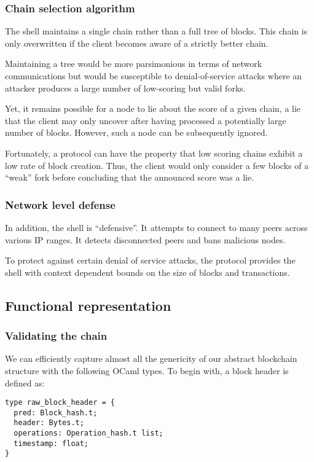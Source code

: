 \documentclass[letterpaper]{article}
\begin{document}
\subsubsection{Chain selection algorithm}
The shell maintains a single chain rather than a full tree of blocks. This chain
is only overwritten if the client becomes aware of a strictly better chain.

Maintaining a tree would be more parsimonious in terms of network communications
but would be susceptible to denial-of-service attacks where an attacker produces
a large number of low-scoring but valid forks.

Yet, it remains possible for a node to lie about the score of a given
chain, a lie that the client may only uncover after having processed a
potentially large number of blocks. However, such a node can be subsequently
ignored.

Fortunately, a protocol can have the property that low scoring chains exhibit a
low rate of block creation. Thus, the client would only consider a few blocks of
a ``weak'' fork before concluding that the announced score was a lie.

\subsubsection{Network level defense}
In addition, the shell is ``defensive''.
It attempts to connect to many peers across various IP ranges. It detects
disconnected peers and bans malicious nodes.

To protect against certain denial of service attacks, the protocol provides the
shell with context dependent bounds on the size of blocks and transactions.

\subsection{Functional representation}

\subsubsection{Validating the chain}

We can efficiently capture almost all the genericity
of our abstract blockchain structure with the following OCaml types.
To begin with, a block header is defined as:

\lstset{
  language=[Objective]Caml
}
\begin{lstlisting}
type raw_block_header = {
  pred: Block_hash.t;
  header: Bytes.t;
  operations: Operation_hash.t list;
  timestamp: float;
}
\end{lstlisting}
\end{document}
